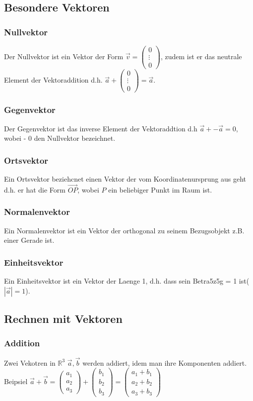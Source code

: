 \documentclass[a4paper]{article} %
\begin{document}
	\subsection{Besondere Vektoren}
	\subsubsection{Nullvektor}
	Der Nullvektor ist ein Vektor der Form $\vec{v} = \begin{pmatrix} 0 \\ \vdots \\ 0 \end{pmatrix}$, 
	 zudem ist er das neutrale Element der Vektoraddition d.h. $ \vec{a} + \begin{pmatrix} 0 \\ \vdots \\ 0 \end{pmatrix} = \vec{a}$.
	\subsubsection{Gegenvektor}
	Der Gegenvektor ist das inverse Element der Vektoraddtion d.h $ \vec{a}+ -\vec{a}=0$, wobei - $0$ den Nullvektor bezeichnet.
	\subsubsection{Ortsvektor}
	Ein Ortsvektor beziehcnet einen Vektor der vom Koordinatenursprung aus geht d.h. er hat die Form $\vec{OP}$, wobei $P$ ein beliebiger Punkt im Raum ist.
	\subsubsection{Normalenvektor}
	Ein Normalenvektor ist ein Vektor der orthogonal zu seinem Bezugsobjekt z.B. einer Gerade ist. 
	\subsubsection{Einheitsvektor}
	Ein Einheitsvektor ist ein Vektor der Laenge 1, d.h. dass sein Betra5z5g = 1 ist($|\vec{a}|=1$).
	\subsection{Rechnen mit Vektoren}
	\subsubsection{Addition}
	Zwei Vekotren in $\mathbb{R}^3$ $\vec{a}, \vec{b}$ werden addiert, idem man ihre Komponenten addiert.
	\\Beipsiel
	$\vec{a}+\vec{b}=\begin{pmatrix}a_1\\a_2\\a_3\end{pmatrix}+\begin{pmatrix}b_1\\b_2\\b_3\end{pmatrix}=\begin{pmatrix}a_1+b_1\\a_2+b_2\\a_3+b_3\end{pmatrix}$
\end{document}
